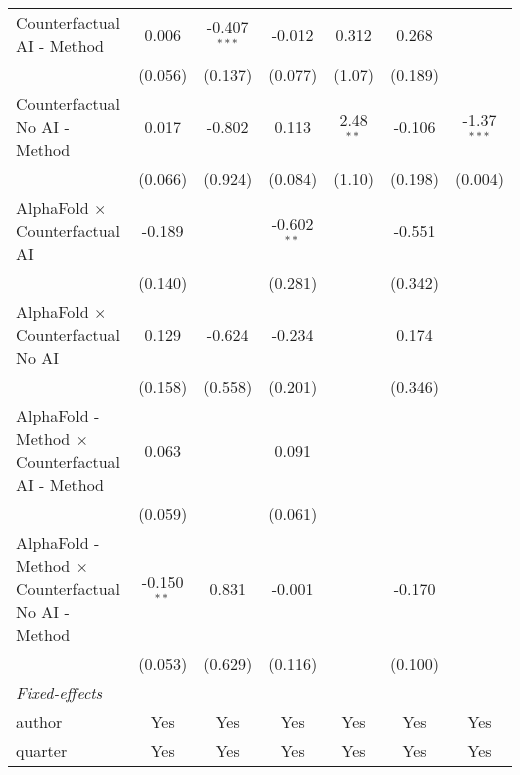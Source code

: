 \begin{tabular}{lcccccc}
   Counterfactual AI - Method                                 & 0.006         & -0.407$^{***}$ & -0.012        & 0.312       & 0.268   &   \\   
                                                              & (0.056)       & (0.137)        & (0.077)       & (1.07)      & (0.189) &   \\   
   Counterfactual No AI - Method                              & 0.017         & -0.802         & 0.113         & 2.48$^{**}$ & -0.106  & -1.37$^{***}$\\   
                                                              & (0.066)       & (0.924)        & (0.084)       & (1.10)      & (0.198) & (0.004)\\   
   AlphaFold $\times$ Counterfactual AI                       & -0.189        &                & -0.602$^{**}$ &             & -0.551  &   \\   
                                                              & (0.140)       &                & (0.281)       &             & (0.342) &   \\   
   AlphaFold $\times$ Counterfactual No AI                    & 0.129         & -0.624         & -0.234        &             & 0.174   &   \\   
                                                              & (0.158)       & (0.558)        & (0.201)       &             & (0.346) &   \\   
   AlphaFold - Method $\times$ Counterfactual AI - Method     & 0.063         &                & 0.091         &             &         &   \\   
                                                              & (0.059)       &                & (0.061)       &             &         &   \\   
   AlphaFold - Method $\times$ Counterfactual No AI - Method  & -0.150$^{**}$ & 0.831          & -0.001        &             & -0.170  &   \\   
                                                              & (0.053)       & (0.629)        & (0.116)       &             & (0.100) &   \\   
   \midrule
   \emph{Fixed-effects}\\
   author                                                     & Yes           & Yes            & Yes           & Yes         & Yes     & Yes\\  
   quarter                                                    & Yes           & Yes            & Yes           & Yes         & Yes     & Yes\\  

\end{tabular}
